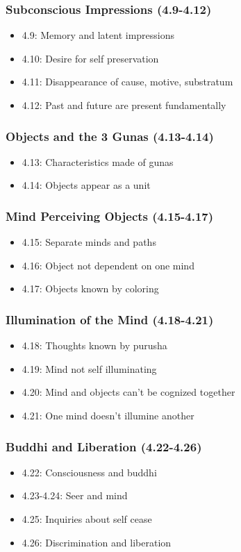 \begin{frame}[fragile]\frametitle{Subconscious Impressions (4.9-4.12)}
\begin{itemize}
\item 4.9: Memory and latent impressions
\item 4.10: Desire for self preservation
\item 4.11: Disappearance of cause, motive, substratum
\item 4.12: Past and future are present fundamentally
\end{itemize}
\end{frame}

\begin{frame}[fragile]\frametitle{Objects and the 3 Gunas (4.13-4.14)}
\begin{itemize}
\item 4.13: Characteristics made of gunas
\item 4.14: Objects appear as a unit
\end{itemize}
\end{frame}

\begin{frame}[fragile]\frametitle{Mind Perceiving Objects (4.15-4.17)}
\begin{itemize}
\item 4.15: Separate minds and paths
\item 4.16: Object not dependent on one mind
\item 4.17: Objects known by coloring
\end{itemize}
\end{frame}

\begin{frame}[fragile]\frametitle{Illumination of the Mind (4.18-4.21)}
\begin{itemize}
\item 4.18: Thoughts known by purusha
\item 4.19: Mind not self illuminating
\item 4.20: Mind and objects can't be cognized together  
\item 4.21: One mind doesn't illumine another
\end{itemize}
\end{frame}

\begin{frame}[fragile]\frametitle{Buddhi and Liberation (4.22-4.26)}
\begin{itemize}
\item 4.22: Consciousness and buddhi
\item 4.23-4.24: Seer and mind
\item 4.25: Inquiries about self cease  
\item 4.26: Discrimination and liberation
\end{itemize}
\end{frame}


